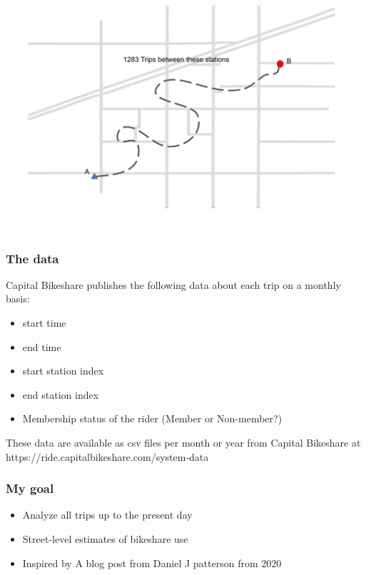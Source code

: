 \documentclass{beamer}
\begin{document}
\begin{frame}
    \includegraphics[width=\textwidth,page=10]{graphics_document.pdf}
\end{frame}


\begin{frame}
    \frametitle{The data}
    
    Capital Bikeshare publishes the following data about each trip on a monthly basis:
    
    \begin{itemize}
        \item start time
        \item end time
        \item start station index
        \item end station index
        \item Membership status of the rider (Member or Non-member?)
    \end{itemize}
    
    These data are available as csv files per month or year from Capital Bikeshare at https://ride.capitalbikeshare.com/system-data
\end{frame}

\begin{frame}
    \frametitle{My goal}
    
    \begin{itemize}
        \item Analyze all trips up to the present day
        \item Street-level estimates of bikeshare use
        \item Inspired by A blog post from Daniel J patterson from 2020
    \end{itemize}
    
\end{frame}
\end{document}
